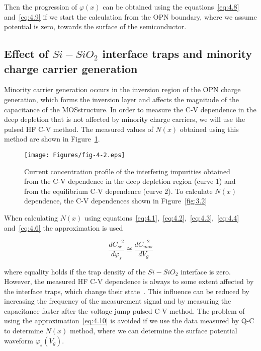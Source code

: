 Then the progression of $\varphi(x)$ can be obtained using the
equations~\ref{eq:4.8} and~\ref{eq:4.9} if we start the calculation
from the OPN boundary, where we assume potential is zero, towards the
surface of the semiconductor.


\subsection[Effect of $Si-SiO_{2}$ interface traps and minority charge carrier generation]{Effect of $Si-SiO_{2}$ interface traps and minority charge carrier generation}\label{sec:4.1.3}

Minority carrier generation occurs in the inversion region of the OPN
charge generation, which forms the inversion layer and affects the
magnitude of the capacitance of the MOS\@ structure. In order to
measure the C-V dependence in the deep depletion that is not affected
by minority charge carriers, we will use the pulsed HF C-V method. The
measured values of $N(x)$ obtained using this method are shown in
Figure~\ref{fig:4.2}.

\begin{figure}[h!]\centering
  \texttt{[image: Figures/fig-4-2.eps]}%
  \caption[Concentration profile of interfering impurities obtained
    from C-V dependence in the deep depletion region and from the
    equilibrium C-V dependence]{Current concentration profile of the
    interfering impurities obtained from the C-V dependence in the
    deep depletion region (curve 1) and from the equilibrium C-V
    dependence (curve 2). To calculate $N(x)$ dependence, the C-V
    dependences shown in Figure~\ref{fig:3.2}}\label{fig:4.2}
\end{figure}

\par When calculating $N(x)$ using
equations~\ref{eq:4.1},~\ref{eq:4.2},~\ref{eq:4.3},~\ref{eq:4.4}
and~\ref{eq:4.6} the approximation is used

\begin{equation}\label{eq:4.10}
  \frac{dC_{sc}^{-2}}{d\varphi_{s}} \cong \frac{dC_{mos}^{-2}}{dV_{g}}
\end{equation}

where equality holds if the trap density of the $Si-SiO_{2}$ interface
is zero. However, the measured HF C-V dependence is always to some
extent affected by the interface traps, which change their
state~\cite{4.15}. This influence can be reduced by increasing the
frequency of the measurement signal and by measuring the capacitance
faster after the voltage jump pulsed C-V method.  The problem of using
the approximation~\ref{eq:4.10} is avoided if we use the data measured
by Q-C to determine $N(x)$ method, where we can determine the surface
potential waveform $\varphi_{s}(V_{g})$.

